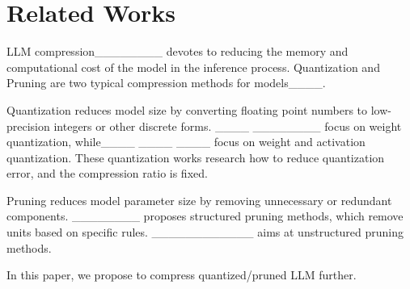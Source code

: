 \section{Related Works}
LLM compression________ devotes to reducing the memory and computational cost of the model in the inference process. Quantization and Pruning are two typical compression methods for models____.

Quantization reduces model size by converting floating point numbers to low-precision integers or other discrete forms. ____ ________ focus on weight quantization, while____ ____ ____ focus on weight and activation quantization. These quantization works research how to reduce quantization error, and the compression ratio is fixed. 



Pruning reduces model parameter size by removing unnecessary or redundant components. ________ proposes structured pruning methods, which remove units based on specific rules. ____________ aims at unstructured pruning methods. 

In this paper, we propose to compress quantized/pruned LLM further.

